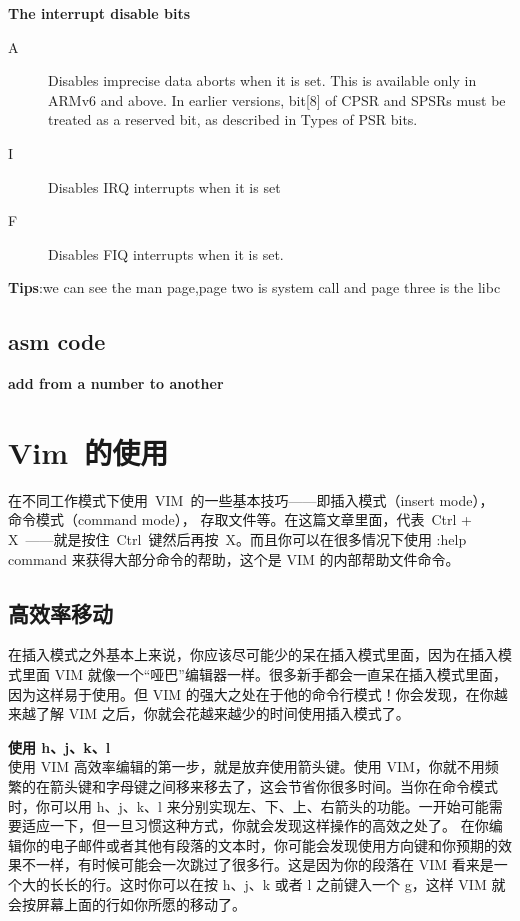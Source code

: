\textbf{The interrupt disable bits}\\
\begin{description}
\item[A] Disables imprecise data aborts when it is set. This is available only in ARMv6 and above.
In earlier versions, bit[8] of CPSR and SPSRs must be treated as a reserved bit, as described
in Types of PSR bits.
\item[I] Disables IRQ interrupts when it is set
\item[F] Disables FIQ interrupts when it is set.
\end{description}
\textbf{Tips}:we can see the man page,page two is system call and page three is the libc

\subsection{asm code}
\textbf{add from a number to another}

\section{Vim~的使用}
\indent 在不同工作模式下使用~VIM~的一些基本技巧——即插入模式（insert mode）， 命令模式（command mode）， 存取文件等。在这篇文章里面，代表~Ctrl + X~——就是按住~Ctrl~键然后再按~X。而且你可以在很多情况下使用 :help command 来获得大部分命令的帮助，这个是 VIM 的内部帮助文件命令。

\subsection{高效率移动}
在插入模式之外基本上来说，你应该尽可能少的呆在插入模式里面，因为在插入模式里面 VIM 就像一个“哑巴”编辑器一样。很多新手都会一直呆在插入模式里面，因为这样易于使用。但 VIM 的强大之处在于他的命令行模式！你会发现，在你越来越了解 VIM 之后，你就会花越来越少的时间使用插入模式了。

\textbf{使用 h、j、k、l}\\
使用 VIM 高效率编辑的第一步，就是放弃使用箭头键。使用 VIM，你就不用频繁的在箭头键和字母键之间移来移去了，这会节省你很多时间。当你在命令模式时，你可以用 h、j、k、l 来分别实现左、下、上、右箭头的功能。一开始可能需要适应一下，但一旦习惯这种方式，你就会发现这样操作的高效之处了。
在你编辑你的电子邮件或者其他有段落的文本时，你可能会发现使用方向键和你预期的效果不一样，有时候可能会一次跳过了很多行。这是因为你的段落在 VIM 看来是一个大的长长的行。这时你可以在按 h、j、k 或者 l 之前键入一个 g，这样 VIM 就会按屏幕上面的行如你所愿的移动了。

